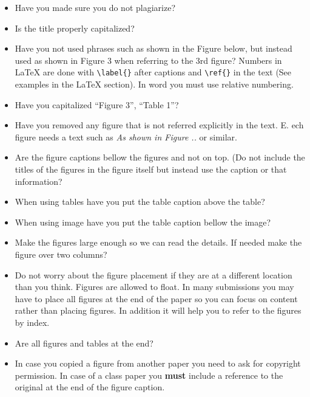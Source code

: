 \begin{itemize}[label=$\Box$]
\item Have you made sure you do not plagiarize?

\item Is the title properly capitalized?

\item Have you not used phrases such as shown in the Figure below, but
  instead used as shown in Figure 3 when referring to the 3rd figure?
  Numbers in LaTeX are done with \verb|\label{}| after captions and
  \verb|\ref{}| in the text (See examples in the LaTeX section). In
  word you must use relative numbering.

\item Have you capitalized ``Figure 3'', ``Table 1''?

\item Have you removed any figure that is not referred explicitly in
  the text. E. ech figure needs a text such as  {\em As shown in
    Figure ..} or similar.

\item Are the figure captions bellow the figures and not on top. (Do
  not include the titles of the figures in the figure itself but
  instead use the caption or that information?

\item When using tables have you put the table caption above the table?

\item When using image have you put the table caption bellow the image?

\item Make the figures large enough so we can read the details. If
  needed make the figure over two columns? 

\item Do not worry about the figure placement if they are at a
  different location than you think. Figures are allowed to float. In
  many submissions you may have to place all figures at the end of the
  paper so you can focus on content rather than placing figures. In
  addition it will help you to refer to the figures by index.

\item Are all figures and tables at the end?

\item In case you copied a figure from another paper you need to ask
  for copyright permission. In case of a class paper you \textbf{must}
  include a reference to the original at the end of the figure caption.


\end{itemize}

